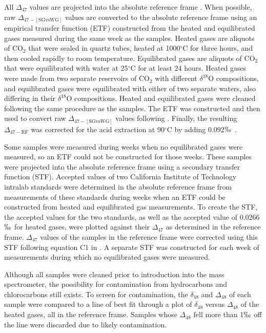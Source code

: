 \documentclass{article}
\newcommand{\deltao}{$\delta^{18}$}
\newcommand{\degrees}{$^{\circ}$}
\begin{document}
All $\Delta_{47}$ values are projected into the absolute reference frame \citep{Dennis2011}. When possible, raw $\Delta_{47-[\text{SGvsWG}]}$ values are converted to the absolute reference frame using an empirical transfer function (ETF) constructed from the heated and equilibrated  gases measured during the same week as the samples. Heated gases are aliquots of CO$_2$ that were sealed in quartz tubes, heated at 1000\degrees C for three hours, and then cooled rapidly to room temperature. Equilibrated gases are aliquots of CO$_2$ that were equilibrated with water at 25\degrees C for at least 24 hours. Heated gases were made from two separate reservoirs of CO$_2$ with different \deltao O compositions, and equilibrated gases were equilibrated with either of two separate waters, also differing in their \deltao O compositions. Heated and equilibrated gases were cleaned following the same procedure as the samples. The ETF was constructed and then used to convert raw $\Delta_{47-[\text{SGvsWG}]}$ values following \cite{Dennis2011}. Finally, the resulting $\Delta_{47-\text{RF}}$ was corrected for the acid extraction at 90\degrees C by adding 0.092$\permil$ \citep{Henkes2013}. 

Some samples were measured during weeks when no equilibrated gases were measured, so an ETF could not be constructed for those weeks. These samples were projected into the absolute reference frame using a secondary transfer function (STF). Accepted values of two California Institute of Technology intralab standards were determined in the absolute reference frame from measurements of these standards during weeks when an ETF could be constructed from heated and equilibrated gas measurements. To create the STF, the accepted values for the two standards, as well as the accepted value of 0.0266$\permil$ for heated gases, were plotted against their $\Delta_{47}$ as determined in the \cite{Ghosh2006} reference frame. $\Delta_{47}$ values of the samples in the \cite{Ghosh2006} reference frame were corrected using this STF following equation C1 in \cite{Dennis2011}. A separate STF was constructed for each week of measurements during which no equilibrated gases were measured.

Although all samples were cleaned prior to introduction into the mass spectrometer, the possibility for contamination from hydrocarbons and chlorocarbons still exists. To screen for contamination, the $\delta_{48}$ and $\Delta_{48}$ of each sample were compared to a line of best fit through a plot of $\delta_{48}$ versus $\Delta_{48}$ of the heated gases, all in the \cite{Ghosh2006} reference frame. Samples whose $\Delta_{48}$ fell more than 1$\permil$ off the line were discarded due to likely contamination. 
\end{document}
